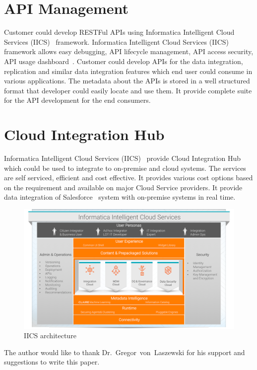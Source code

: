 \section{API Management}

Customer could develop RESTFul APIs using Informatica Intelligent
Cloud Services (IICS)~\cite{hid-sp18-511-iics} framework. Informatica
Intelligent Cloud Services (IICS)~\cite{hid-sp18-511-iics} framework
allows easy debugging, API lifecycle management, API access security,
API usage dashboard~\cite{hid-sp18-511-iics-pricing}. Customer could
develop APIs for the data integration, replication and similar data
integration features which end user could consume in various
applications. The metadata about the APIs is stored in a well
structured format that developer could easily locate and use them. It
provide complete suite for the API development for the end consumers.

\section{Cloud Integration Hub}
Informatica Intelligent Cloud Services (IICS)~\cite{hid-sp18-511-iics}
provide Cloud Integration Hub~\cite{hid-sp18-511-iics-hub} which could
be used to integrate to on-premise and cloud systems. The services are
self serviced, efficient and cost effective. It provides various cost
options based on the requirement and available on major Cloud Service
providers. It provide data integration of
Salesforce~\cite{hid-sp18-511-salesforce} system with on-premise
systems in real time.

\begin{figure}[!ht]
	\centering\includegraphics[width=\columnwidth]{images/iics-diagram.png} \caption{IICS
	architecture}\label{f:iics-products}
\end{figure}

\begin{acks}

The author would like to thank Dr.~Gregor~von~Laszewski for his
support and suggestions to write this paper.

\end{acks}


 
